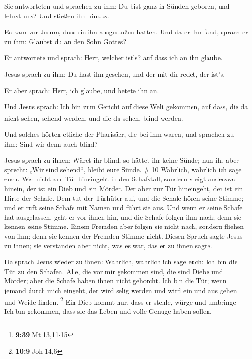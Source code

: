  Sie antworteten und sprachen zu ihm: Du bist ganz in
Sünden geboren, und lehrst uns? Und stießen ihn hinaus.

 Es kam vor Jesum, dass sie ihn ausgestoßen hatten. Und da
er ihn fand, sprach er zu ihm: Glaubst du an den Sohn Gottes?

 Er antwortete und sprach: Herr, welcher ist's? auf dass
ich an ihn glaube.

 Jesus sprach zu ihm: Du hast ihn gesehen, und der mit dir
redet, der ist's.

 Er aber sprach: Herr, ich glaube, und betete ihn an.

 Und Jesus sprach: Ich bin zum Gericht auf diese Welt
gekommen, auf dass, die da nicht sehen, sehend werden, und die da sehen,
blind werden. \footnote{\textbf{9:39} Mt 13,11-15}

 Und solches hörten etliche der Pharisäer, die bei ihm
waren, und sprachen zu ihm: Sind wir denn auch blind?

 Jesus sprach zu ihnen: Wäret ihr blind, so hättet ihr
keine Sünde; nun ihr aber sprecht: „Wir sind sehend``, bleibt eure
Sünde. \# 10  Wahrlich, wahrlich ich sage euch: Wer nicht
zur Tür hineingeht in den Schafstall, sondern steigt anderswo hinein,
der ist ein Dieb und ein Mörder.  Der aber zur Tür
hineingeht, der ist ein Hirte der Schafe.  Dem tut der
Türhüter auf, und die Schafe hören seine Stimme; und er ruft seine
Schafe mit Namen und führt sie aus.  Und wenn er seine
Schafe hat ausgelassen, geht er vor ihnen hin, und die Schafe folgen ihm
nach; denn sie kennen seine Stimme.  Einem Fremden aber
folgen sie nicht nach, sondern fliehen von ihm; denn sie kennen der
Fremden Stimme nicht.  Diesen Spruch sagte Jesus zu ihnen;
sie verstanden aber nicht, was es war, das er zu ihnen sagte.

 Da sprach Jesus wieder zu ihnen: Wahrlich, wahrlich ich
sage euch: Ich bin die Tür zu den Schafen.  Alle, die vor
mir gekommen sind, die sind Diebe und Mörder; aber die Schafe haben
ihnen nicht gehorcht.  Ich bin die Tür; wenn jemand durch
mich eingeht, der wird selig werden und wird ein und aus gehen und Weide
finden. \footnote{\textbf{10:9} Joh 14,6}  Ein Dieb kommt
nur, dass er stehle, würge und umbringe. Ich bin gekommen, dass sie das
Leben und volle Genüge haben sollen.

